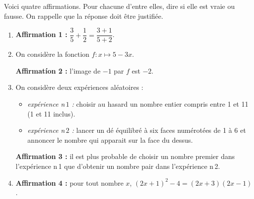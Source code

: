 
\medskip


Voici quatre affirmations. Pour chacune d'entre elles, dire si elle est vraie ou fausse. On rappelle que la réponse doit être justifiée.

\medskip

\begin{enumerate}[itemsep=5mm]
	\item \textbf{Affirmation 1 :} $\dfrac{3}{5} + \dfrac{1}{2} = \dfrac{3 + 1}{5 + 2}$.	
	\item On considère la fonction $f: x \longmapsto 5 - 3x$.
		
\textbf{Affirmatíon 2 :} l'image de $-1$ par $f$ est $-2$.	
	\item On considère deux expériences aléatoires :
		\begin{itemize}
			\item \emph{expérience n\,$1$ :} choisir au hasard un nombre entier compris entre 1 et 11 (1 et 11 inclus).			
			\item \emph{expérience n\,$2$ :} lancer un dé équilibré à six faces numérotées de 1 à 6 et annoncer le nombre qui apparait sur la face du dessus.
		\end{itemize}
	
	\textbf{Affirmation 3 :} il est plus probable de choisir un nombre premier dans l'expérience n\,1 que d'obtenir un nombre pair dans l'expérience n\,2.	
	\item \textbf{Affirmation 4 :} pour tout nombre $x$, \quad $(2x + 1)^2 - 4 = (2x + 3)(2x - 1)$.
\end{enumerate}


